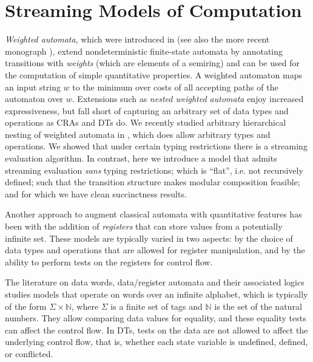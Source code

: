 \section{Streaming Models of Computation}


\emph{Weighted automata}, which were introduced in \cite{S1961WA} (see also the more recent monograph \cite{DKV2009HWA}), extend nondeterministic finite-state automata by annotating transitions with \emph{weights} (which are elements of a semiring) and can be used for the computation of simple quantitative properties. A weighted automaton maps an input string $w$ to the minimum over costs of all accepting paths of the automaton over $w$.
Extensions such as \emph{nested weighted automata} \cite{CHO2015NWA} enjoy increased expressiveness, but fall short of capturing an arbitrary set of data types and operations as CRAs and DTs do. We recently studied arbitrary hierarchical nesting of weighted automata in \cite{AMS2017SA}, which does allow arbitrary types and operations. We showed that under certain typing restrictions there is a streaming evaluation algorithm. In contrast, here we introduce a model that admits streaming evaluation \emph{sans} typing restrictions; which is ``flat'', i.e. not recursively defined; such that the transition structure makes modular composition feasible; and for which we have clean succinctness results.

Another approach to augment classical automata with quantitative features has been with the addition of \emph{registers} that can store values from a potentially infinite set. These models are typically varied in two aspects: by the choice of data types and operations that are allowed for register manipulation, and by the ability to perform tests on the registers for control flow.

The literature on data words, data/register automata and their associated logics \cite{KF1994FMA, NSV2004FSM, DL2009LFQ, BS2010NRDL, BDMSS2011LDW} studies models that operate on words over an infinite alphabet, which is typically of the form $\Sigma \times \mathbb{N}$, where $\Sigma$ is a finite set of tags and $\mathbb{N}$ is the set of the natural numbers. They allow comparing data values for equality, and these equality tests can affect the control flow.
In DTs, tests on the data are not allowed to affect the underlying control flow, that is, whether each state variable is undefined, defined, or conflicted.

